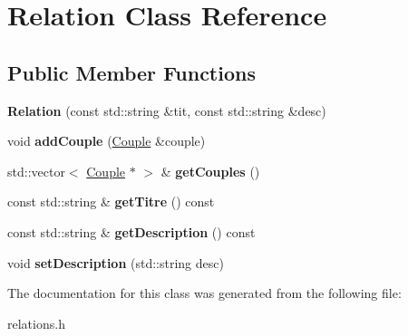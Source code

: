 \hypertarget{class_relation}{}\section{Relation Class Reference}
\label{class_relation}
\subsection*{Public Member Functions}
\begin{DoxyCompactItemize}
\item 
\mbox{\label{class_relation_ad80d3956dac01f647bdbb740fdd1cf73}} 
{\bfseries Relation} (const std\+::string \&tit, const std\+::string \&desc)
\item 
\mbox{\label{class_relation_ad51e21a7258d6980f479dbb21f9e510c}} 
void {\bfseries add\+Couple} (\hyperlink{class_couple}{Couple} \&couple)
\item 
\mbox{\label{class_relation_a5801afed8aa44bde9fd31db7fc019e17}} 
std\+::vector$<$ \hyperlink{class_couple}{Couple} $\ast$ $>$ \& {\bfseries get\+Couples} ()
\item 
\mbox{\label{class_relation_a5cc64235be3be20a82e9ec07486b289c}} 
const std\+::string \& {\bfseries get\+Titre} () const
\item 
\mbox{\label{class_relation_a3d43bd45798051dc3aa6015aa225a7c0}} 
const std\+::string \& {\bfseries get\+Description} () const
\item 
\mbox{\label{class_relation_a481de051dc44065bb816b9b94b5d0c48}} 
void {\bfseries set\+Description} (std\+::string desc)
\end{DoxyCompactItemize}


The documentation for this class was generated from the following file\+:\begin{DoxyCompactItemize}
\item 
relations.\+h\end{DoxyCompactItemize}
